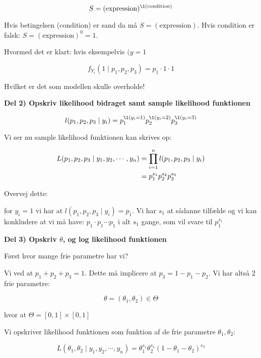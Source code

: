 \begin{equation}
S = (\text{expression})^{\1(\text{condition})}
\end{equation}

Hvis betingelsen (condition) er sand da må $S=(\text{expression})$. Hvis condition er falsk: $S= (\text{expression})^0 = 1$.

Hvormed det er klart: hvis eksempelvis $(y=1$

\begin{equation}
    f_{Y_i}(1 \mid p_1, p_2, p_3) = p_1 \cdot 1 \cdot 1
\end{equation}

Hvilket er det som modellen skulle overholde!

\textbf{Del 2) Opskriv likelihood bidraget samt sample likelihood funktionen}

\begin{equation}
    l (p_1, p_2, p_3 \mid y_i) =  p_1^{\1(y_i=1)} p_2^{\1(y_i=2)}p_3^{\1(y_i=3)}
\end{equation}

Vi ser nu sample likelihood funktionen kan skrives op:

\begin{align}
    L (p_1, p_2, p_3 \mid y_1, y_2 , \cdots , y_{n}) &= \prod_{i=1}^{n} l(p_1, p_2, p_3 \mid y_i) \\
    &= p_1^{s_1} p_2^{s_2} p_3^{s_3}
\end{align}

Overvej dette:

for $y_i = 1$ vi har at $l(p_1, p_2, p_3 \mid y_i) = p_1$. Vi har $s_1$ at sådanne tilfælde og vi kan konkludere at vi må have: $p_1 \cdot p_1 \cdots p_1$ i alt $s_1$ gange, som vil svare til $p_1^{s_1}$

\textbf{Del 3) Opskriv $\theta$, og log likelihood funktionen}

Først hvor mange frie parametre har vi?

Vi ved at $p_1 + p_2 + p_3 = 1$. Dette må implicere at $p_3 = 1 - p_1 - p_2$. Vi har altså 2 frie parametre:

\begin{equation}
    \theta = (\theta_1 ,\theta_2 ) \in \Theta
\end{equation}

hvor at $\Theta = [0,1] \times [0,1]$

Vi opskriver likelihood funktionen som funktion af de frie parametre $\theta_1, \theta_2$:

\begin{equation}
    L (\theta_1, \theta_2 \mid y_1, y_2 , \cdots , y_{n}) =  \theta_1^{s_1} \theta_2^{s_2} (1 - \theta_1 - \theta_2)^{s_3}
\end{equation}


